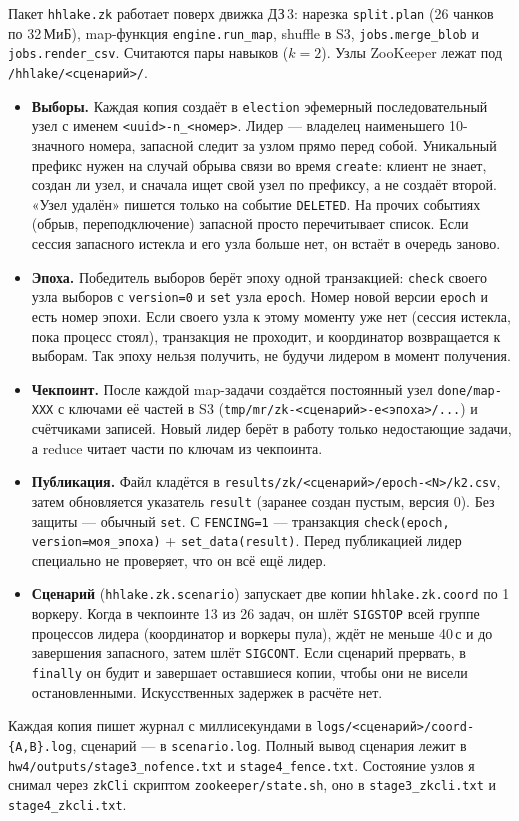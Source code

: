 \documentclass[11pt,a4paper]{article}
\newcommand{\code}[1]{\texttt{#1}}
\begin{document}
Пакет \code{hhlake.zk} работает поверх движка ДЗ\,3: нарезка \code{split.plan} (26 чанков по 32\,МиБ), map-функция \code{engine.run\_map}, shuffle в S3, \code{jobs.merge\_blob} и \code{jobs.render\_csv}. Считаются пары навыков ($k=2$). Узлы ZooKeeper лежат под \code{/hhlake/<сценарий>/}.
\begin{itemize}
  \item \textbf{Выборы.} Каждая копия создаёт в \code{election} эфемерный последовательный узел с именем \code{<uuid>-n\_<номер>}. Лидер --- владелец наименьшего 10-значного номера, запасной следит за узлом прямо перед собой. Уникальный префикс нужен на случай обрыва связи во время \code{create}: клиент не знает, создан ли узел, и сначала ищет свой узел по префиксу, а не создаёт второй. «Узел удалён» пишется только на событие \code{DELETED}. На прочих событиях (обрыв, переподключение) запасной просто перечитывает список. Если сессия запасного истекла и его узла больше нет, он встаёт в очередь заново.
  \item \textbf{Эпоха.} Победитель выборов берёт эпоху одной транзакцией: \code{check} своего узла выборов с \code{version=0} и \code{set} узла \code{epoch}. Номер новой версии \code{epoch} и есть номер эпохи. Если своего узла к этому моменту уже нет (сессия истекла, пока процесс стоял), транзакция не проходит, и координатор возвращается к выборам. Так эпоху нельзя получить, не будучи лидером в момент получения.
  \item \textbf{Чекпоинт.} После каждой map-задачи создаётся постоянный узел \code{done/map-XXX} с ключами её частей в S3 (\code{tmp/mr/zk-<сценарий>-e<эпоха>/...}) и счётчиками записей. Новый лидер берёт в работу только недостающие задачи, а reduce читает части по ключам из чекпоинта.
  \item \textbf{Публикация.} Файл кладётся в \code{results/zk/<сценарий>/epoch-<N>/k2.csv}, затем обновляется указатель \code{result} (заранее создан пустым, версия 0). Без защиты --- обычный \code{set}. С \code{FENCING=1} --- транзакция \code{check(epoch, version=моя\_эпоха)} + \code{set\_data(result)}. Перед публикацией лидер специально не проверяет, что он всё ещё лидер.
  \item \textbf{Сценарий} (\code{hhlake.zk.scenario}) запускает две копии \code{hhlake.zk.coord} по 1 воркеру. Когда в чекпоинте 13 из 26 задач, он шлёт \code{SIGSTOP} всей группе процессов лидера (координатор и воркеры пула), ждёт не меньше 40\,с и до завершения запасного, затем шлёт \code{SIGCONT}. Если сценарий прервать, в \code{finally} он будит и завершает оставшиеся копии, чтобы они не висели остановленными. Искусственных задержек в расчёте нет.
\end{itemize}
Каждая копия пишет журнал с миллисекундами в \code{logs/<сценарий>/coord-\{A,B\}.log}, сценарий --- в \code{scenario.log}. Полный вывод сценария лежит в \code{hw4/outputs/stage3\_nofence.txt} и \code{stage4\_fence.txt}. Состояние узлов я снимал через \code{zkCli} скриптом \code{zookeeper/state.sh}, оно в \code{stage3\_zkcli.txt} и \code{stage4\_zkcli.txt}.
\end{document}
